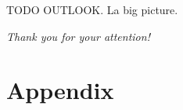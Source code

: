 \documentclass[10pt]{beamer}
\begin{document}
\begin{frame}[fragile]{TODO}
	OUTLOOK. La big picture. 
\end{frame}



	\begin{frame}{}
	\label{frame:thankyouslide}
		\vfill
	  \centering 
	  {\Huge\color{red} 
	  \emph{Thank you for your attention!}}
		\vfill
		\centering
	\end{frame}







\appendix



\section{Appendix}
\end{document}
